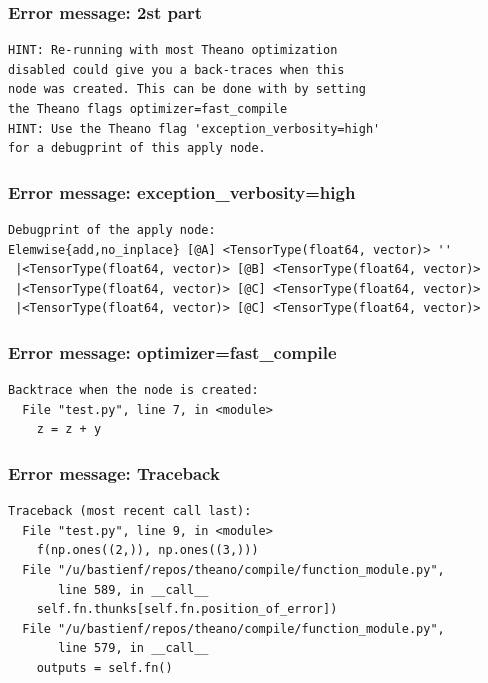 \documentclass[utf8x,xcolor=pdftex,dvipsnames,table]{beamer}
\begin{document}
\begin{frame}[fragile]
  \frametitle{Error message: 2st part}

\begin{lstlisting}
HINT: Re-running with most Theano optimization
disabled could give you a back-traces when this
node was created. This can be done with by setting
the Theano flags optimizer=fast_compile
HINT: Use the Theano flag 'exception_verbosity=high'
for a debugprint of this apply node.
\end{lstlisting}
\end{frame}

\begin{frame}[fragile]
  \frametitle{Error message: exception\_verbosity=high}

\begin{lstlisting}
Debugprint of the apply node:
Elemwise{add,no_inplace} [@A] <TensorType(float64, vector)> ''
 |<TensorType(float64, vector)> [@B] <TensorType(float64, vector)>
 |<TensorType(float64, vector)> [@C] <TensorType(float64, vector)>
 |<TensorType(float64, vector)> [@C] <TensorType(float64, vector)>
\end{lstlisting}
\end{frame}

\begin{frame}[fragile]
  \frametitle{Error message: optimizer=fast\_compile}

\begin{lstlisting}
Backtrace when the node is created:
  File "test.py", line 7, in <module>
    z = z + y

\end{lstlisting}
\end{frame}

\begin{frame}[fragile]
  \frametitle{Error message: Traceback}

\begin{lstlisting}
Traceback (most recent call last):
  File "test.py", line 9, in <module>
    f(np.ones((2,)), np.ones((3,)))
  File "/u/bastienf/repos/theano/compile/function_module.py",
       line 589, in __call__
    self.fn.thunks[self.fn.position_of_error])
  File "/u/bastienf/repos/theano/compile/function_module.py",
       line 579, in __call__
    outputs = self.fn()

\end{lstlisting}
\end{frame}
\end{document}
